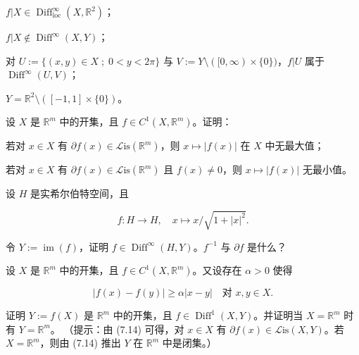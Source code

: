\begin{exercises}
\begin{items}
$ f|X \in \operatorname{Diff}^{\infty}_{\mathrm{loc}}(X,\mathbb{R}^2) $；

\item

$ f|X \notin \operatorname{Diff}^{\infty}(X,Y) $；

\item

对 $ U := \{(x,y) \in X \; ; \; 0 < y < 2\pi\} $ 与 $ V := Y \setminus ([0,\infty) \times \{0\}) $，$ f|U $ 属于 $ \operatorname{Diff}^{\infty}(U,V) $；

\item

$ Y = \mathbb{R}^2 \setminus ([-1,1] \times \{0\}) $。

\end{items}

\item

设 $ X $ 是 $ \mathbb{R}^m $ 中的开集，且 $ f \in C^1(X,\mathbb{R}^m) $。证明：

\begin{items}
\item

若对 $ x \in X $ 有 $ \partial f(x) \in \mathcal{L}\mathrm{is}(\mathbb{R}^m) $，则 $ x \mapsto |f(x)| $ 在 $ X $ 中无最大值；

\item

若对 $ x \in X $ 有 $ \partial f(x) \in \mathcal{L}\mathrm{is}(\mathbb{R}^m) $ 且 $ f(x) \ne 0 $，则 $ x \mapsto |f(x)| $ 无最小值。

\end{items}

\item

设 $ H $ 是实希尔伯特空间，且

\[
f: H \to H , \quad x \mapsto x/\sqrt{1 + |x|^2} .
\]

令 $ Y := \operatorname{im}(f) $，证明 $ f \in \operatorname{Diff}^{\infty}(H,Y) $。$ f^{-1} $ 与 $ \partial f $ 是什么？

\item

设 $ X $ 是 $ \mathbb{R}^m $ 中的开集，且 $ f \in C^1(X,\mathbb{R}^m) $。又设存在 $ \alpha > 0 $ 使得

\begin{equation}
|f(x) - f(y)| \ge \alpha |x - y| \quad \text{对 } x,y \in X .\tag{7.14}
\end{equation}

证明 $ Y := f(X) $ 是 $ \mathbb{R}^m $ 中的开集，且 $ f \in \operatorname{Diff}^1(X,Y) $。并证明当 $ X = \mathbb{R}^m $ 时有 $ Y = \mathbb{R}^m $。
（提示：由 (7.14) 可得，对 $ x \in X $ 有 $ \partial f(x) \in \mathcal{L}\mathrm{is}(X,Y) $。若 $ X = \mathbb{R}^m $，则由 (7.14) 推出 $ Y $ 在 $ \mathbb{R}^m $ 中是闭集。）


\end{exercises}
